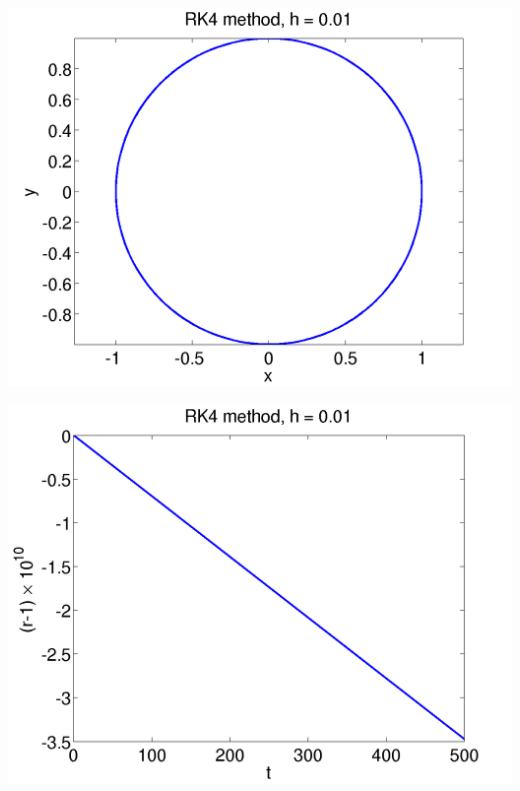 \documentclass{beamer}
\begin{document}
\begin{frame}
\begin{columns}
\begin{column}{0.5\textwidth}
\begin{overlayarea}{\textwidth}{0.6\textheight}
{\begin{center}
          \end{center}
        }
        {
          \begin{center}
            \includegraphics[height=0.5\textheight]{figures/RK4_2}
          \end{center}
        }
        {
          \begin{center}
            \includegraphics[height=0.5\textheight]{figures/RK4_rad2}
          \end{center}
        }
      \end{overlayarea}
    \end{column}
  \end{columns}

\end{frame}
\end{document}
